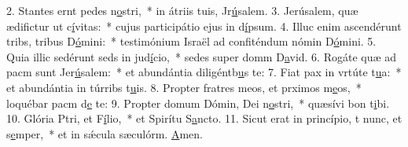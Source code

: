 2. Stantes ernt pedes n\uline{o}stri,~* in átriis tuis, Jr\uline{ú}salem.
3. Jerúsalem, quæ ædifictur ut c\uline{í}vitas:~* cujus participátio ejus in d\uline{í}psum.
4. Illuc enim ascendérunt tribs, tribus D\uline{ó}mini:~* testimónium Israël ad confiténdum nómin D\uline{ó}mini.
5. Quia illic sedérunt seds in jud\uline{í}cio,~* sedes super domm D\uline{a}vid.
6. Rogáte quæ ad pacm sunt Jer\uline{ú}salem:~* et abundántia diligéntb\uline{u}s te:
7. Fiat pax in vrtúte t\uline{u}a:~* et abundántia in túrribs t\uline{u}is.
8. Propter fratres meos, et prximos m\uline{e}os,~* loquébar pacm d\uline{e} te:
9. Propter domum Dómin, Dei n\uline{o}stri,~* quæsívi bon t\uline{i}bi.
10. Glória Ptri, et F\uline{í}lio,~* et Spirítu S\uline{a}ncto.
11. Sicut erat in princípio, t nunc, et s\uline{e}mper,~* et in sǽcula sæculórm. \uline{A}men.
